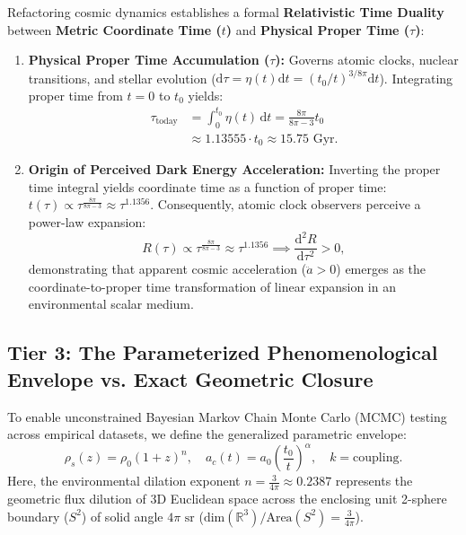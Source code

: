 \documentclass[aps,prd,reprint,superscriptaddress,nofootinbib,floatfix,amsmath,amssymb]{revtex4-2}
\begin{document}
Refactoring cosmic dynamics establishes a formal \textbf{Relativistic Time Duality} between \textbf{Metric Coordinate Time ($t$)} and \textbf{Physical Proper Time ($\tau$)}:
\begin{enumerate}
    \item \textbf{Physical Proper Time Accumulation ($\tau$):} Governs atomic clocks, nuclear transitions, and stellar evolution ($\mathrm{d}\tau = \eta(t) \mathrm{d}t = (t_0/t)^{3/8\pi} \mathrm{d}t$). Integrating proper time from $t=0$ to $t_0$ yields:
    \begin{align}
    \tau_{\text{today}} &= \int_0^{t_0} \eta(t) \, \mathrm{d}t = \frac{8\pi}{8\pi - 3} t_0 \nonumber \\
    &\approx 1.13555 \cdot t_0 \approx 15.75\text{ Gyr}.
    \label{eq:proper_time}
    \end{align}
    \item \textbf{Origin of Perceived Dark Energy Acceleration:} Inverting the proper time integral yields coordinate time as a function of proper time: $t(\tau) \propto \tau^{\frac{8\pi}{8\pi-3}} \approx \tau^{1.1356}$. Consequently, atomic clock observers perceive a power-law expansion:
    \begin{equation}
    R(\tau) \propto \tau^{\frac{8\pi}{8\pi-3}} \approx \tau^{1.1356} \implies \frac{\mathrm{d}^2 R}{\mathrm{d}\tau^2} > 0,
    \label{eq:proper_acceleration}
    \end{equation}
    demonstrating that apparent cosmic acceleration ($\ddot{a}>0$) emerges as the coordinate-to-proper time transformation of linear expansion in an environmental scalar medium.
\end{enumerate}

\subsection{Tier 3: The Parameterized Phenomenological Envelope vs. Exact Geometric Closure}
\label{sec:tier3_envelope}

To enable unconstrained Bayesian Markov Chain Monte Carlo (MCMC) testing across empirical datasets, we define the generalized parametric envelope:
\begin{equation}
\rho_s(z) = \rho_0 (1+z)^n, \quad a_c(t) = a_0 \left( \frac{t_0}{t} \right)^\alpha, \quad k = \text{coupling}.
\label{eq:gen_envelope}
\end{equation}
Here, the environmental dilation exponent $n = \frac{3}{4\pi} \approx 0.2387$ represents the geometric flux dilution of 3D Euclidean space across the enclosing unit 2-sphere boundary ($S^2$) of solid angle $4\pi\text{ sr}$ ($\text{dim}(\mathbb{R}^3)/\text{Area}(S^2) = \frac{3}{4\pi}$).
\end{document}
